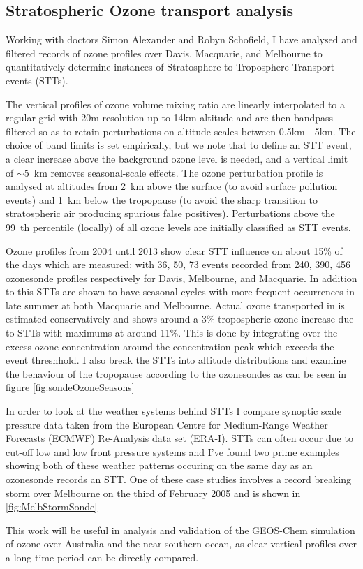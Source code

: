 \subsection{Stratospheric Ozone transport analysis}
Working with doctors Simon Alexander and Robyn Schofield, I have analysed and filtered records of ozone profiles over Davis, Macquarie, and Melbourne to quantitatively determine instances of Stratosphere to Troposphere Transport events (STTs).

The vertical profiles of ozone volume mixing ratio are linearly interpolated to a regular grid with 20m resolution up to 14km altitude and are then bandpass filtered so as to retain perturbations on altitude scales between 0.5km - 5km. The choice of band limits is set empirically, but we note that to define an STT event, a clear increase above the background ozone level is needed, and a vertical limit of $\sim 5$~km removes seasonal-scale effects. 
The ozone perturbation profile is analysed at altitudes from 2~km above the surface (to avoid surface pollution events) and 1~km below the tropopause (to avoid the sharp transition to stratospheric air producing spurious false positives). Perturbations above the 99~th percentile (locally) of all ozone levels are initially classified as STT events.

Ozone profiles from 2004 until 2013 show clear STT influence on about 15\% of the days which are measured: with 36, 50, 73 events recorded from 240, 390, 456 ozonesonde profiles respectively for Davis, Melbourne, and Macquarie.
In addition to this STTs are shown to have seasonal cycles with more frequent occurrences in late summer at both Macquarie and Melbourne.
Actual ozone transported in is estimated conservatively and shows around a 3\% tropospheric ozone increase due to STTs with maximums at around 11\%.
This is done by integrating over the excess ozone concentration around the concentration peak which exceeds the event threshhold. 
I also break the STTs into altitude distributions and examine the behaviour of the tropopause according to the ozonesondes as can be seen in figure \ref{fig:sondeOzoneSeasons}

In order to look at the weather systems behind STTs I compare synoptic scale pressure data taken from the European Centre for Medium-Range Weather Forecasts (ECMWF) Re-Analysis data set (ERA-I).
STTs can often occur due to cut-off low and low front pressure systems and I've found two prime examples showing both of these weather patterns occuring on the same day as an ozonesonde records an STT.
One of these case studies involves a record breaking storm over Melbourne on the third of February 2005 and is shown in \ref{fig:MelbStormSonde}

This work will be useful in analysis and validation of the GEOS-Chem simulation of ozone over Australia and the near southern ocean, as clear vertical profiles over a long time period can be directly compared.